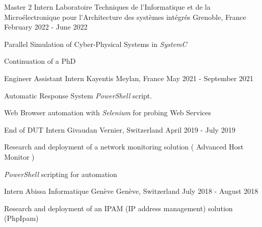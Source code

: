 

\begin{cventries}

  \cventry
    {Master 2 Intern} %
    {Laboratoire Techniques de l'Informatique et de la Microélectronique pour l'Architecture des systèmes intégrés} %
    {Grenoble, France} %
    {February 2022 - June 2022} %
    {
      \begin{cvitems} %
        \item{Parallel Simulation of Cyber-Physical Systems in \emph{SystemC}}
        \item{Continuation of a PhD}
      \end{cvitems}
    }

  \cventry
    {Engineer Assistant Intern} %
    {Kayentis} %
    {Meylan, France} %
    {May 2021 - September 2021} %
    {
      \begin{cvitems} %
        \item {Automatic Response System \emph{PowerShell} script.}
        \item {Web Browser automation with \emph{Selenium} for probing Web Services}
      \end{cvitems}
    }

  \cventry
    {End of DUT Intern} %
    {Givaudan} %
    {Vernier, Switzerland} %
    {April 2019 - July 2019} %
    {
      \begin{cvitems} %
        \item {Research and deployment of a network monitoring solution ( Advanced Host Monitor )}
        \item {\emph{PowerShell} scripting for automation}
      \end{cvitems}
    }
  \cventry
    {Intern} %
    {Abissa Informatique Genève} %
    {Genève, Switzerland} %
    {July 2018 - August 2018} %
    {
      \begin{cvitems} %
        \item {Research and deployment of an IPAM (IP address management) solution (PhpIpam)}
      \end{cvitems}
    }
\end{cventries}
